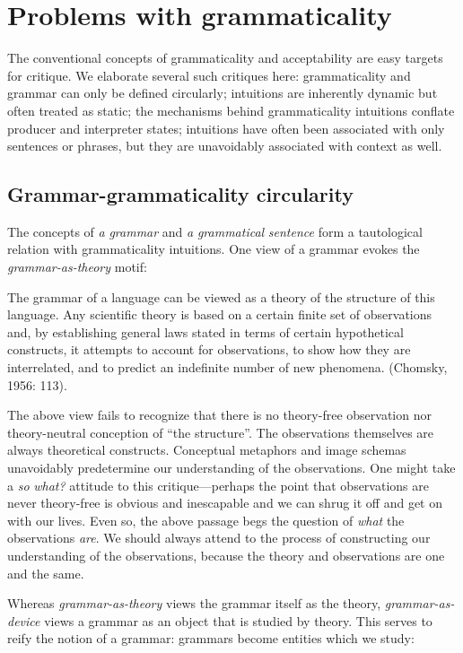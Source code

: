 \section{Problems with grammaticality}

The conventional concepts of grammaticality and acceptability are easy targets for critique. We elaborate several such critiques here: grammaticality and grammar can only be defined circularly; intuitions are inherently dynamic but often treated as static; the mechanisms behind grammaticality intuitions conflate producer and interpreter states; intuitions have often been associated with only sentences or phrases, but they are unavoidably associated with context as well.

\subsection{Grammar-grammaticality circularity}

The concepts of \textit{a} \textit{grammar} and \textit{a} \textit{grammatical} \textit{sentence} form a tautological relation with grammaticality intuitions. One view of a grammar evokes the \textit{grammar-as-theory} motif:

The grammar of a language can be viewed as a theory of the structure of this language. Any scientific theory is based on a certain finite set of observations and, by establishing general laws stated in terms of certain hypothetical constructs, it attempts to account for observations, to show how they are interrelated, and to predict an indefinite number of new phenomena. (Chomsky, 1956: 113).

  The above view fails to recognize that there is no theory-free observation nor theory-neutral conception of “the structure”. The observations themselves are always theoretical constructs. Conceptual metaphors and image schemas unavoidably predetermine our understanding of the observations. One might take a \textit{so} \textit{what?} attitude to this critique—perhaps the point that observations are never theory-free is obvious and inescapable and we can shrug it off and get on with our lives. Even so, the above passage begs the question of \textit{what} the observations \textit{are}. We should always attend to the process of constructing our understanding of the observations, because the theory and observations are one and the same.

  Whereas \textit{grammar-as-theory} views the grammar itself as the theory, \textit{grammar-as-device} views a grammar as an object that is studied by theory. This serves to reify the notion of a grammar: grammars become entities which we study:

